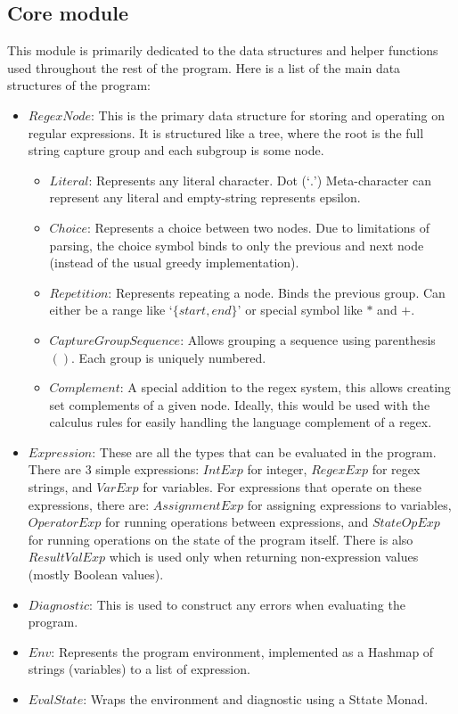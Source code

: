 \documentclass[letterpaper, 11pt]{article}
\begin{document}
\subsection{Core module}\label{code:core}
This module is primarily dedicated to the data structures and helper functions used throughout the rest of the program.
Here is a list of the main data structures of the program:
\begin{itemize}[itemsep=-0.5em]
    \item $RegexNode$: This is the primary data structure for storing and operating on regular expressions. It is structured like a tree, where the root is the full string capture group and each subgroup is some node.
    \begin{itemize}[itemsep=-0.3em]
        \item $Literal$: Represents any literal character. Dot (`$.$') Meta-character can represent any literal and empty-string represents epsilon.
        \item $Choice$: Represents a choice between two nodes. Due to limitations of parsing, the choice symbol binds to only the previous and next node (instead of the usual greedy implementation).
        \item $Repetition$: Represents repeating a node. Binds the previous group. Can either be a range like `$\{start, end\}$' or special symbol like $*$ and $+$.
        \item $Capture Group Sequence$: Allows grouping a sequence using parenthesis $()$. Each group is uniquely numbered.
        \item $Complement$: A special addition to the regex system, this allows creating set complements of a given node. Ideally, this would be used with the calculus rules for easily handling the language complement of a regex.
    \end{itemize}
    \item $Expression$: These are all the types that can be evaluated in the program. There are 3 simple expressions: $IntExp$ for integer, $RegexExp$ for regex strings, and $VarExp$ for variables. For expressions that operate on these expressions, there are: $AssignmentExp$ for assigning expressions to variables, $OperatorExp$ for running operations between expressions, and $StateOpExp$ for running operations on the state of the program itself. There is also $ResultValExp$ which is used only when returning non-expression values (mostly Boolean values).
    \item $Diagnostic$: This is used to construct any errors when evaluating the program.
    \item $Env$: Represents the program environment, implemented as a Hashmap of strings (variables) to a list of expression.
    \item $EvalState$: Wraps the environment and diagnostic using a Sttate Monad. 
\end{itemize}
\end{document}
